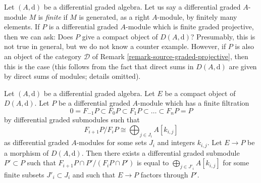 \begin{remark}
\label{remark-graded-projective-is-compact}
Let $(A, \text{d})$ be a differential graded algebra. Let us say a
differential graded $A$-module $M$ is {\it finite} if $M$ is generated,
as a right $A$-module, by finitely many elements. If $P$ is a
differential graded $A$-module which is finite graded projective,
then we can ask: Does $P$ give a compact object of $D(A, \text{d})$?
Presumably, this is not true in general, but we do not know a
counter example. However, if $P$ is also an object of the category
$\mathcal{D}$ of Remark \ref{remark-source-graded-projective},
then this is the case (this follows from the fact that direct sums
in $D(A, \text{d})$ are given by direct sums of modules; details omitted).
\end{remark}

\begin{lemma}
\label{lemma-factor-through-nicer}
Let $(A, \text{d})$ be a differential graded algebra. Let $E$ be a compact
object of $D(A, \text{d})$. Let $P$ be a differential graded $A$-module
which has a finite filtration
$$
0 = F_{-1}P \subset F_0P \subset F_1P \subset \ldots \subset F_nP = P
$$
by differential graded submodules such that
$$
F_{i + 1}P/F_iP \cong \bigoplus\nolimits_{j \in J_i} A[k_{i, j}]
$$
as differential graded $A$-modules for some sets $J_i$ and integers $k_{i, j}$.
Let $E \to P$ be a morphism of $D(A, \text{d})$.
Then there exists a differential graded submodule $P' \subset P$ such that
$F_{i + 1}P \cap P'/(F_iP \cap P')$ is equal to
$\bigoplus_{j \in J'_i} A[k_{i, j}]$ for some finite subsets
$J'_i \subset J_i$ and such that $E \to P$ factors through $P'$.
\end{lemma}

